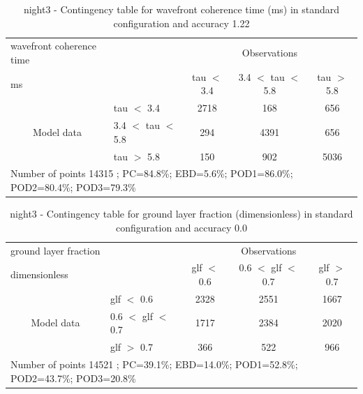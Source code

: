 \begin{table}[p!]
\begin{center}
\begin{tabular}{llccc}
\hline
{wavefront coherence time}                                       &                                                    & \multicolumn{3}{c}{Observations}                 \\
{ms}                                       &                             & tau $<$ 3.4   & 3.4 $<$ tau $<$ 5.8 & tau $>$ 5.8 \\
\hline
\multicolumn{1}{c}{\multirow{3}{*}{Model data}}  & tau $<$ 3.4             & 2718                & 168                       & 656              \\
                                                 & 3.4  $<$ tau $<$ 5.8 & 294                & 4391                       & 656              \\
                                                 & tau $>$ 5.8             & 150                & 902                       & 5036              \\
\hline
\multicolumn{5}{l}{ Number of points        14315 ; PC=84.8\%; EBD=5.6\%; POD1=86.0\%; POD2=80.4\%; POD3=79.3\%}
\end{tabular}
\end{center}
\caption{night3 - Contingency table for  wavefront coherence time (ms) in standard configuration and accuracy 1.22}
\label{tab:contingencytauBEF:night3}
\end{table}
\clearpage
\begin{table}[p!]
\begin{center}
\begin{tabular}{llccc}
\hline
{ground layer fraction}                                       &                                                    & \multicolumn{3}{c}{Observations}                 \\
{dimensionless}                                       &                             & glf $<$ 0.6   & 0.6 $<$ glf $<$ 0.7 & glf $>$ 0.7 \\
\hline
\multicolumn{1}{c}{\multirow{3}{*}{Model data}}  & glf $<$ 0.6             & 2328                & 2551                       & 1667              \\
                                                 & 0.6  $<$ glf $<$ 0.7 & 1717                & 2384                       & 2020              \\
                                                 & glf $>$ 0.7             & 366                & 522                       & 966              \\
\hline
\multicolumn{5}{l}{ Number of points        14521 ; PC=39.1\%; EBD=14.0\%; POD1=52.8\%; POD2=43.7\%; POD3=20.8\%}
\end{tabular}
\end{center}
\caption{night3 - Contingency table for  ground layer fraction (dimensionless) in standard configuration and accuracy 0.0}
\label{tab:contingencyglfBEF:night3}
\end{table}

